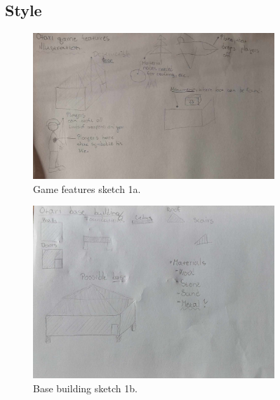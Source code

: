 \documentclass[a4paper,10pt,english]{article}
\begin{document}
\begin{figure}[h]
\subsection*{Style}
\centering

\begin{subfigure}{0.5\linewidth}
    \includegraphics[width=\linewidth]{otari_sketch.jpg}
    \caption{Game features sketch 1a.}
    \label{Fig:Style1A}
\end{subfigure}
\par\bigskip
\begin{subfigure}{0.5\linewidth}
    \includegraphics[width=\linewidth]{otari_base_sketch.jpg}
    \caption{Base building sketch 1b.}
    \label{Fig:Style1B}
\end{subfigure}
\par\bigskip
\begin{subfigure}{0.5\linewidth}

\end{subfigure}
\end{figure}
\end{document}

